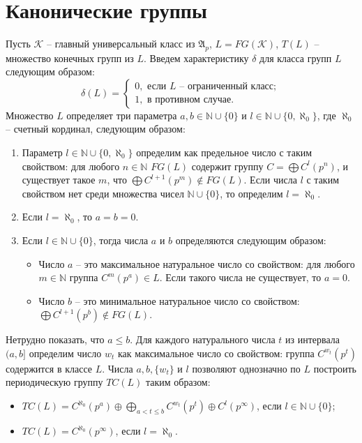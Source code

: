 \documentclass[12pt]{extarticle} %
\def\A{{\mathfrak{A}}}
\def\K{{\mathcal{K}}}
\def\N{{\mathbb{N}}}
\begin{document}
\section{Канонические группы} 
Пусть $\K$ -- главный универсальный класс из $\A_p$, $L = FG(\K)$, $T(L)$ -- множество конечных групп из $L$. Введем характеристику $\delta$ для класса групп $L$ следующим образом:
$$\delta(L) = \left\lbrace 
\begin{array}{l}  
0, \text{ если } L \text{ -- ограниченный класс}; \\ 
1, \text{ в противном случае.}
\end{array} 
\right.$$
Множество $L$ определяет три параметра $a,b \in \N \cup \{0\}$ и $l \in \N \cup \{0, \aleph_0 \}$, где $\aleph_0$ -- счетный кординал, следующим образом:
\begin{enumerate}
\item Параметр $l \in \N \cup \{0, \aleph_0\}$ определим как предельное число с таким свойством: для любого $n \in \N$ $FG(L)$ содержит группу $C = \bigoplus C^l(p^n)$, и существует такое $m$, что $\bigoplus C^{l+1}(p^m) \notin FG(L)$. Если числа $l$ с таким свойством нет среди множества чисел $\N \cup \{0\}$, то определим $l = \aleph_0$.
\item Если $l = \aleph_0$, то $a = b = 0$.
\item Если $l \in \N \cup \{0\}$, тогда числа $a$ и $b$ определяются следующим образом:
\begin{itemize}
 \item Число $a$ -- это максимальное натуральное число со свойством: для любого $m \in \N$ группа $C^m(p^a) \in L$. Если такого числа не существует, то $a = 0$.
 \item Число $b$ -- это минимальное натуральное число со свойством: $\bigoplus C^{l+1}(p^b) \notin FG(L)$.
\end{itemize} 
\end{enumerate}

Нетрудно показать, что $a \leq b$. Для каждого натурального числа $t$ из интервала $(a,b]$ определим число $w_t$ как максимальное число со свойством: группа $C^{w_t}(p^t)$ содержится в классе $L$. Числа $a, b, \{w_t\}$ и $l$ позволяют однозначно по $L$ построить периодическую группу $TC(L)$ таким образом:
\begin{itemize}
\item $TC(L) = C^{\aleph_0}(p^a) \oplus \bigoplus\limits_{a < t \leq b} C^{w_t}(p^t) \oplus C^l(p^\infty)$, если $l \in \N \cup\{0\}$;
\item $TC(L) = C^{\aleph_0}(p^\infty)$, если $l = \aleph_0$.
\end{itemize}
\end{document}
